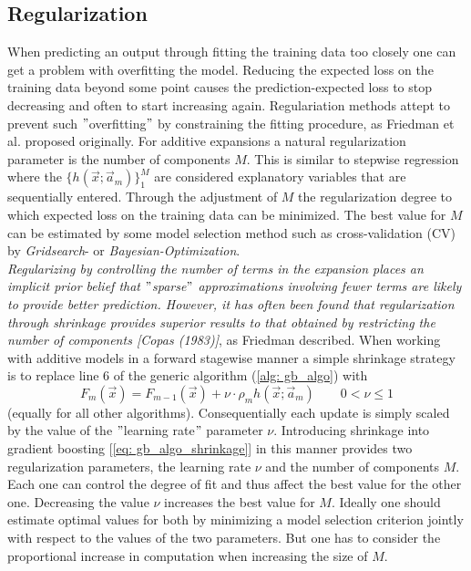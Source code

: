 \documentclass[12pt, a4paper]{article}
\begin{document}
\subsection{Regularization}
When predicting an output through fitting the training data too closely one can get a problem with overfitting the model. Reducing the expected loss on the training data beyond some point causes the prediction-expected loss to stop decreasing and often to start increasing again. 
Regulariation methods attept to prevent such $"$overfitting$"$ by constraining the fitting procedure, as Friedman et al. \cite{Friedman2001} proposed originally.
For additive expansions a natural regularization parameter is the number of components $M$. This is similar to stepwise regression where the $\{h(\vec{x};\vec{a}_m)\}_1^M$ are considered explanatory variables that are sequentially entered. Through the adjustment of $M$ the regularization degree to which expected loss on the training data can be minimized. The best value for $M$ can be estimated by some model selection method such as cross-validation (CV) by \textit{Gridsearch}- or \textit{Bayesian-Optimization}. \\
\textit{Regularizing by controlling the number of terms in the expansion places an
implicit prior belief that $"$sparse$"$ approximations involving fewer terms are
likely to provide better prediction. However, it has often been found that regularization through shrinkage provides superior results to that obtained by
restricting the number of components [Copas (1983)]}, as Friedman \cite{Friedman2001} described.
When working with additive models in a forward stagewise manner a simple shrinkage strategy is to replace line 6 of the generic algorithm (\ref{alg: gb_algo}) with
\begin{equation}
    \label{eq: gb_algo_shrinkage}
    F_m(\vec{x}) = F_{m-1}(\vec{x}) + \nu \cdot \rho_{m} h(\vec{x};\vec{a}_m) \qquad 0 < \nu \leq 1
\end{equation}
(equally for all other algorithms). Consequentially each update is simply scaled by the value of the $"$learning rate$"$ parameter $\nu$.
Introducing shrinkage into gradient boosting [\ref{eq: gb_algo_shrinkage}] in this manner provides two regularization parameters, the learning rate $\nu$ and the number of components $M$. Each one can control the degree of fit and thus affect the best value for the other one. Decreasing the value $\nu$ increases the best value for $M$. Ideally one should estimate optimal values for both by minimizing a model selection criterion jointly with respect to the values of the two parameters. But one has to consider the proportional increase in computation when increasing the size of $M$.
\end{document}
